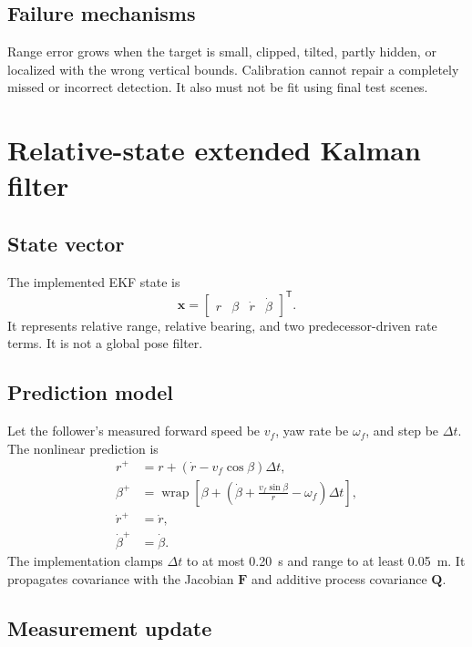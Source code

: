 \documentclass[11pt,oneside,openany]{book}
\begin{document}
\section{Failure mechanisms}

Range error grows when the target is small, clipped, tilted, partly hidden, or localized with the wrong vertical bounds. Calibration cannot repair a completely missed or incorrect detection. It also must not be fit using final test scenes.

\chapter{Relative-state extended Kalman filter}

\section{State vector}

The implemented EKF state is
\begin{equation}
\mathbf{x}=\begin{bmatrix}r & \beta & \dot r & \dot\beta\end{bmatrix}^{\mathsf T}.
\end{equation}
It represents relative range, relative bearing, and two predecessor-driven rate terms. It is not a global pose filter.

\section{Prediction model}

Let the follower's measured forward speed be $v_f$, yaw rate be $\omega_f$, and step be $\Delta t$. The nonlinear prediction is
\begin{align}
r^+ &= r+(\dot r-v_f\cos\beta)\Delta t,\\
\beta^+ &= \operatorname{wrap}\left[\beta+\left(\dot\beta+\frac{v_f\sin\beta}{r}-\omega_f\right)\Delta t\right],\\
\dot r^+ &= \dot r,\\
\dot\beta^+ &= \dot\beta.
\end{align}
The implementation clamps $\Delta t$ to at most 0.20~s and range to at least 0.05~m. It propagates covariance with the Jacobian $\mathbf F$ and additive process covariance $\mathbf Q$.

\section{Measurement update}
\end{document}

